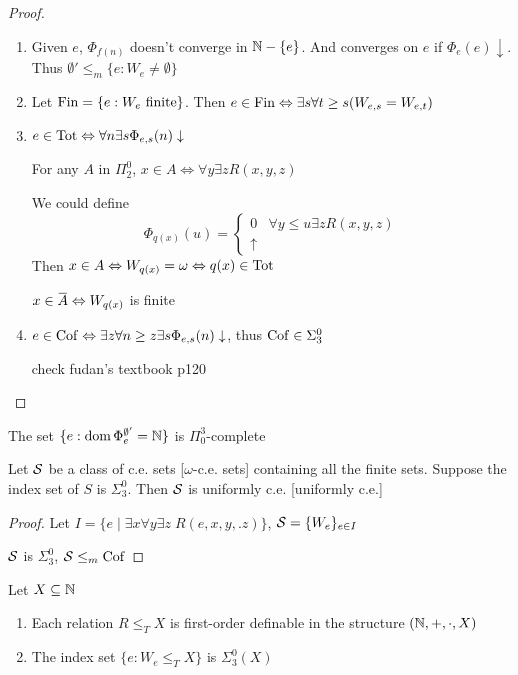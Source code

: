 \documentclass[11pt]{article}
\begin{document}
\begin{proof}
\begin{enumerate}
\item Given \(e\), \(\Phi_{f(n)}\) doesn't converge in \(\mathbb{N}-\{e\}\). And converges on \(e\)
if \(\Phi_e(e)\downarrow\). Thus \(\emptyset'\le_m\{e:W_e\neq\emptyset\}\)
\item Let \(\operatorname{Fin}=\{e:W_e\text{ finite}\}\). Then \(e\in\operatorname{Fin}\Leftrightarrow\exists s\forall t\ge s(W_{e,s}=W_{e,t})\)
\item \(e\in\operatorname{Tot}\Leftrightarrow\forall n\exists s\Phi_{e,s}(n)\downarrow\)

For any \(A\) in \(\Pi_2^0\), \(x\in A\Leftrightarrow\forall y\exists zR(x,y,z)\)

We could define
\begin{equation*}
\Phi_{q(x)}(u)=
\begin{cases}
0&\forall y\le u\exists zR(x,y,z)\\
\uparrow
\end{cases}
\end{equation*}
Then \(x\in A\Leftrightarrow W_{q(x)}=\omega\Leftrightarrow q(x)\in\operatorname{Tot}\)

\(x\in\barA\Leftrightarrow W_{q(x)}\) is finite
\item \(e\in\operatorname{Cof}\Leftrightarrow\exists z\forall n\ge z\exists s\Phi_{e,s}(n)\downarrow\), thus \(\operatorname{Cof}\in\Sigma_3^0\)

check fudan's textbook p120
\end{enumerate}
\end{proof}

\begin{exercise}
\label{1.4.21}
The set \(\{e:\operatorname{dom}\Phi_e^{\emptyset'}=\mathbb{N}\}\) is \(\Pi_0^3\)-complete
\end{exercise}

\begin{exercise}
\label{1.4.22}
Let \(\mathcal{S}\) be a class of c.e. sets [\(\omega\)-c.e. sets] containing all the finite sets. Suppose the
index set of \(S\) is \(\Sigma_3^0\).  Then \(\mathcal{S}\) is uniformly c.e. [uniformly c.e.]
\end{exercise}

\begin{proof}
Let \(I=\{e\mid\exists x\forall y\exists z\;R(e,x,y,.z)\}\), \(\mathcal{S}=\{W_e\}_{e\in I}\)

\(\mathcal{S}\) is \(\Sigma_3^0\), \(\mathcal{S}\le_m\operatorname{Cof}\)
\end{proof}

\begin{exercise}
\label{1.4.24}
Let \(X\subseteq\mathbb{N}\)
\begin{enumerate}
\item Each relation \(R\le_TX\) is first-order definable in the structure \((\mathbb{N},+,\cdot ,X)\)
\item The index set \(\{e:W_e\le_TX\}\) is \(\Sigma_3^0(X)\)
\end{enumerate}
\end{exercise}
\end{document}
